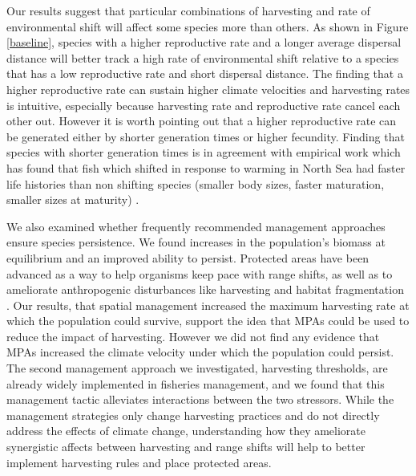 \documentclass[12pt,english]{article}
\begin{document}
\begin{spacing}{1.9}
\begin{flushleft}


Our results suggest that particular combinations of harvesting and rate of environmental shift will affect some species more than others. As shown in Figure \ref{baseline}, species with a higher reproductive rate and a longer average dispersal distance will better track a high rate of environmental shift relative to a species that has a low reproductive rate and short dispersal distance. The finding that a higher reproductive rate can sustain higher climate velocities and harvesting rates is intuitive, especially because harvesting rate and reproductive rate cancel each other out. However it is worth pointing out that a higher reproductive rate can be generated either by shorter generation times or higher fecundity. Finding that species with shorter generation times is in agreement with empirical work which has found that fish which shifted in response to warming in North Sea had faster life histories than non shifting species (smaller body sizes, faster maturation, smaller sizes at maturity) \citep{Perryetal2005}. 

We also examined whether frequently recommended management approaches ensure species persistence. We found increases in the population's biomass at equilibrium and an improved ability to persist. Protected areas have been advanced as a way to help organisms keep pace with range shifts, as well as to ameliorate anthropogenic disturbances like harvesting and habitat fragmentation \citep{Lawleretal2010, Hannahetal2007,Botsfordetal2001, Gaylordetal2005, HastingsBotsford2003,Thomasetal2012}. Our results, that spatial management increased the maximum harvesting rate at which the population could survive, support the idea that MPAs could be used to reduce the impact of harvesting. However we did not find any evidence that MPAs increased the climate velocity under which the population could persist. The second management approach we investigated, harvesting thresholds, are already widely implemented in fisheries management, and we found that this management tactic alleviates interactions between the two stressors.   While the management strategies only change harvesting practices and do not directly address the effects of climate change, understanding how they ameliorate synergistic affects between harvesting and range shifts will help to better implement harvesting rules and place protected areas.



\end{flushleft}
\end{spacing}
\end{document}

